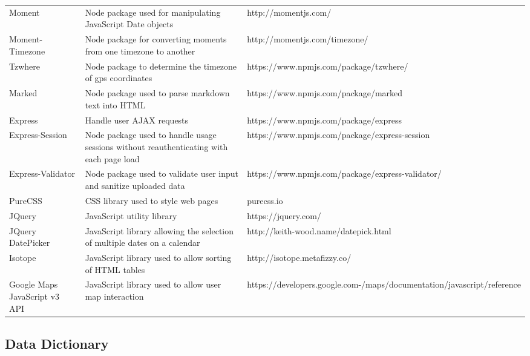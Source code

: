 \documentclass[letterpaper, 10 pt, conference]{ieeeconf}  %
\begin{document}
\begin{tabularx}{\textwidth}{l|X|X}
Moment & Node package used for manipulating JavaScript Date objects & http://momentjs.com/\\
Moment-Timezone & Node package for converting moments from one timezone to another & http://momentjs.com/timezone/\\
Tzwhere & Node package to determine the timezone of gps coordinates & https://www.npmjs.com/package/tzwhere/\\
Marked & Node package used to parse markdown text into HTML & https://www.npmjs.com/package/marked\\
Express & Handle user AJAX requests & https://www.npmjs.com/package/express\\
Express-Session & Node package used to handle usage sessions without reauthenticating with each page load & https://www.npmjs.com/package/express-session\\
Express-Validator & Node package used to validate user input and sanitize uploaded data & https://www.npmjs.com/package/express-validator/\\
PureCSS & CSS library used to style web pages & purecss.io\\
JQuery & JavaScript utility library & https://jquery.com/\\
JQuery DatePicker & JavaScript library allowing the selection of multiple dates on a calendar & http://keith-wood.name/datepick.html\\
Isotope & JavaScript library used to allow sorting of HTML tables &http://isotope.metafizzy.co/\\
Google Maps JavaScript v3 API & JavaScript library used to allow user map interaction & https://developers.google.com-/maps/documentation/javascript/reference\\
\end{tabularx}

\subsection{Data Dictionary}
\newenvironment{dictionary} {
   \begin{flushleft}
   \begin{tabular*}{\textwidth}{>{\refstepcounter{exno}\theexno.}l r}
}
{
   \end{tabular*}
   \end{flushleft}
}
\end{document}
